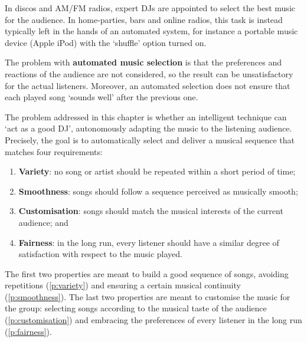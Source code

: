 
In discos and AM/FM radios, expert DJs are appointed to select the best music for the audience. 
In home-parties, bars and online radios, this task is instead typically left in the hands of an automated system, for instance a portable music device (Apple iPod) with the `shuffle' option turned on.

The problem with \textbf{automated music selection} is that the preferences and reactions of the audience are not considered, so the result can be unsatisfactory for the actual listeners. Moreover, an automated selection does not ensure that each played song `sounds well' after the previous one.

The problem addressed in this chapter is whether an intelligent technique can `act as a good DJ', autonomously adapting the music to the listening audience.
Precisely, the goal is to automatically select and deliver a musical sequence that matches four requirements:
 
{\setlength{\leftmargini}{42pt} 
\begin{enumerate}
\renewcommand{\theenumi}{Goal \arabic{enumi}}
\item\label{p:variety} \textbf{Variety}: no song or artist should be repeated within a short period of time;
\item\label{p:smoothness} \textbf{Smoothness}: songs should follow a sequence perceived as musically smooth;
\item\label{p:customisation} \textbf{Customisation}: songs should match the musical interests of the current audience; and
\item\label{p:fairness} \textbf{Fairness}: in the long run, every listener should have a similar degree of satisfaction with respect to the music played.
\end{enumerate}
}
The first two properties are meant to build a good sequence of songs, avoiding repetitions (\ref{p:variety}) and ensuring a certain musical continuity (\ref{p:smoothness}).
The last two properties are meant to customise the music for the group: selecting songs according to the musical taste of the audience (\ref{p:customisation}) and embracing the preferences of every listener in the long run (\ref{p:fairness}).

